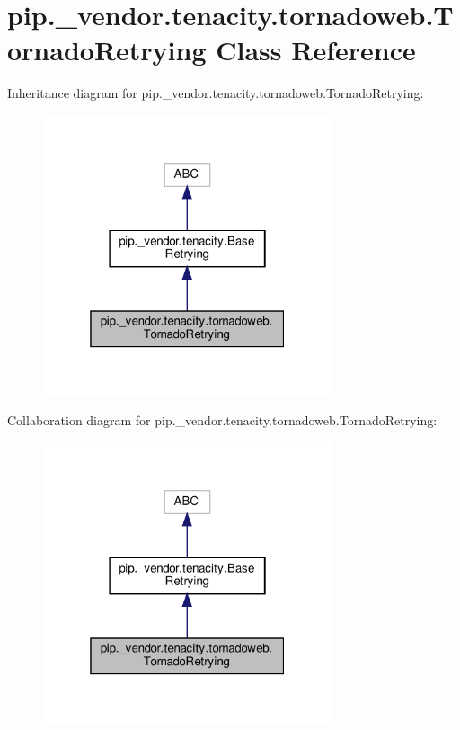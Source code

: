 \hypertarget{classpip_1_1__vendor_1_1tenacity_1_1tornadoweb_1_1TornadoRetrying}{}\section{pip.\+\_\+vendor.\+tenacity.\+tornadoweb.\+Tornado\+Retrying Class Reference}
\label{classpip_1_1__vendor_1_1tenacity_1_1tornadoweb_1_1TornadoRetrying}


Inheritance diagram for pip.\+\_\+vendor.\+tenacity.\+tornadoweb.\+Tornado\+Retrying\+:
\nopagebreak
\begin{figure}[H]
\begin{center}
\leavevmode
\includegraphics[width=241pt]{classpip_1_1__vendor_1_1tenacity_1_1tornadoweb_1_1TornadoRetrying__inherit__graph}
\end{center}
\end{figure}


Collaboration diagram for pip.\+\_\+vendor.\+tenacity.\+tornadoweb.\+Tornado\+Retrying\+:
\nopagebreak
\begin{figure}[H]
\begin{center}
\leavevmode
\includegraphics[width=241pt]{classpip_1_1__vendor_1_1tenacity_1_1tornadoweb_1_1TornadoRetrying__coll__graph}
\end{center}
\end{figure}
